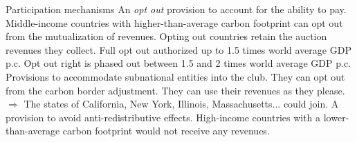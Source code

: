 \documentclass[aspectratio=169,xcolor=dvipsnames, 11pt,mathserif]{beamer}
\begin{document}
\begin{framefont}{\small}
\begin{frame}{Participation mechanisms}
    \bbsp 
    \ip An \textit{opt out} provision to account for the ability to pay.
    \bbvsp \ip Middle-income countries with higher-than-average carbon footprint can opt out from the mutualization of revenues.
        \ip Opting out countries retain the auction revenues they collect.
        \ip Full opt out authorized up to 1.5 times world average GDP p.c. 
        \ip Opt out right is phased out between 1.5 and 2 times world average GDP p.c. 
        \ip {}
        \ee
    \ip Provisions to accommodate subnational entities into the club.
    \bbvsp \ip They can opt out from the carbon border adjustment.
        \ip They can use their revenues as they please.
        \ip $\Rightarrow$ The states of California, New York, Illinois, Massachusetts... could join.%
        \ee
    \ip A provision to avoid anti-redistributive effects.
    \bbvsp \ip High-income countries with a lower-than-average carbon footprint would not receive any revenues.
        \ee
    \ee
\end{frame}


\end{framefont}
\end{document}
